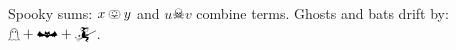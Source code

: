 \documentclass{article}
\begin{document}
Spooky sums: $x \pumpkin y$ and $u \skull v$ combine terms.
Ghosts and bats drift by: $\mathghost + \mathbat + \mathwitch$.
\end{document}
